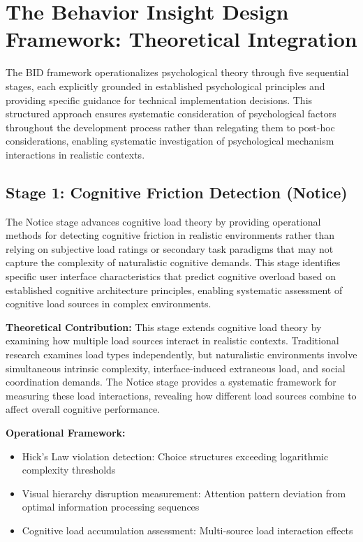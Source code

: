 \documentclass[
  authoryear,
  preprint]{elsarticle}
\providecommand{\tightlist}{%
  \setlength{\itemsep}{0pt}\setlength{\parskip}{0pt}}
\begin{document}
\section{The Behavior Insight Design Framework: Theoretical
Integration}\label{the-behavior-insight-design-framework-theoretical-integration}

The BID framework operationalizes psychological theory through five
sequential stages, each explicitly grounded in established psychological
principles and providing specific guidance for technical implementation
decisions. This structured approach ensures systematic consideration of
psychological factors throughout the development process rather than
relegating them to post-hoc considerations, enabling systematic
investigation of psychological mechanism interactions in realistic
contexts.

\subsection{Stage 1: Cognitive Friction Detection
(Notice)}\label{stage-1-cognitive-friction-detection-notice}

The Notice stage advances cognitive load theory by providing operational
methods for detecting cognitive friction in realistic environments
rather than relying on subjective load ratings or secondary task
paradigms that may not capture the complexity of naturalistic cognitive
demands. This stage identifies specific user interface characteristics
that predict cognitive overload based on established cognitive
architecture principles, enabling systematic assessment of cognitive
load sources in complex environments.

\textbf{Theoretical Contribution:} This stage extends cognitive load
theory by examining how multiple load sources interact in realistic
contexts. Traditional research examines load types independently, but
naturalistic environments involve simultaneous intrinsic complexity,
interface-induced extraneous load, and social coordination demands. The
Notice stage provides a systematic framework for measuring these load
interactions, revealing how different load sources combine to affect
overall cognitive performance.

\textbf{Operational Framework:}

\begin{itemize}
\tightlist
\item
  Hick's Law violation detection: Choice structures exceeding
  logarithmic complexity thresholds
\item
  Visual hierarchy disruption measurement: Attention pattern deviation
  from optimal information processing sequences
\item
  Cognitive load accumulation assessment: Multi-source load interaction
  effects
\end{itemize}
\end{document}
